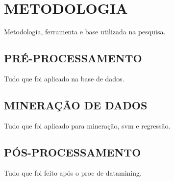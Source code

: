 
\chapter{METODOLOGIA}
\label{chap:metodologia}
Metodologia, ferramenta e base utilizada na pesquisa.

\section{PRÉ-PROCESSAMENTO}
\label{sec:metodologiaPreProc}
Tudo que foi aplicado na base de dados.



\section{MINERAÇÃO DE DADOS}
\label{sec:metodologiaMine}
Tudo que foi aplicado para mineração, svm e regressão.

\section{PÓS-PROCESSAMENTO}
\label{sec:metodologiaPosProc}
Tudo que foi feito após o proc de datamining.